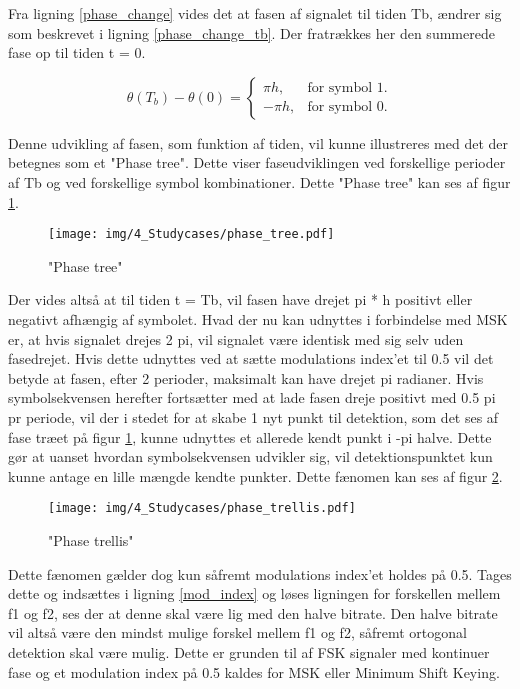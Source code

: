 \begin{appendices}
Fra ligning \ref{phase_change} vides det at fasen af signalet til tiden Tb, ændrer sig som beskrevet i ligning \ref{phase_change_tb}. Der fratrækkes her den summerede fase op til tiden t = 0.

\begin{equation} \label{phase_change_tb}
\theta(T_b) - \theta(0) = \begin{cases}
    \pi h, & \text{for symbol 1}.\\
    -\pi h, & \text{for symbol 0}.
  \end{cases}
\end{equation}

Denne udvikling af fasen, som funktion af tiden, vil kunne illustreres med det der betegnes som et "Phase tree". Dette viser faseudviklingen ved forskellige perioder af Tb og ved forskellige symbol kombinationer. Dette "Phase tree" kan ses af figur \ref{fig:phase_tree}.

\begin{figure}[H]
	\centering{}
	\texttt{[image: img/4\_Studycases/phase\_tree.pdf]}
	\caption{"Phase tree"}
	\label{fig:phase_tree}
\end{figure} 

Der vides altså at til tiden t = Tb, vil fasen have drejet pi * h positivt eller negativt afhængig af symbolet. Hvad der nu kan udnyttes i forbindelse med MSK er, at hvis signalet drejes 2 pi, vil signalet være identisk med sig selv uden fasedrejet. Hvis dette udnyttes ved at sætte modulations index'et til 0.5 vil det betyde at fasen, efter 2 perioder, maksimalt kan have drejet pi radianer. Hvis symbolsekvensen herefter fortsætter med at lade fasen dreje positivt med 0.5 pi pr periode, vil der i stedet for at skabe 1 nyt punkt til detektion, som det ses af fase træet på figur \ref{fig:phase_tree}, kunne udnyttes et allerede kendt punkt i -pi halve. Dette gør at uanset hvordan symbolsekvensen udvikler sig, vil detektionspunktet kun kunne antage en lille mængde kendte punkter. Dette fænomen kan ses af figur \ref{fig:phase_trellis}. 

\begin{figure}[H]
	\centering{}
	\texttt{[image: img/4\_Studycases/phase\_trellis.pdf]}
	\caption{"Phase trellis"}
	\label{fig:phase_trellis}
\end{figure} 

Dette fænomen gælder dog kun såfremt modulations index'et holdes på 0.5. Tages dette og indsættes i ligning \ref{mod_index} og løses ligningen for forskellen mellem f1 og f2, ses der at denne skal være lig med den halve bitrate. Den halve bitrate vil altså være den mindst mulige forskel mellem f1 og f2, såfremt ortogonal detektion skal være mulig. Dette er grunden til af FSK signaler med kontinuer fase og et modulation index på 0.5 kaldes for MSK eller Minimum Shift Keying. 
\pagebreak 


\end{appendices}
